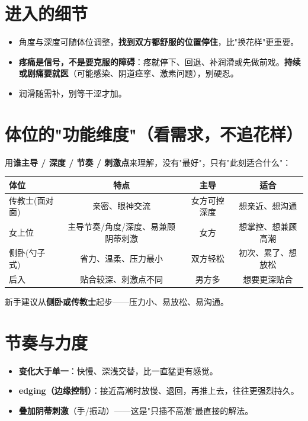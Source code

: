 \section{进入的细节}

\begin{itemize}[leftmargin=2em,itemsep=0.3em]
  \item 角度与深度可随体位调整，\textbf{找到双方都舒服的位置停住}，比"换花样"更重要。
  \item \textbf{疼痛是信号，不是要克服的障碍}：疼就停下、回退、补润滑或先做前戏。\textbf{持续或剧痛要就医}（可能感染、阴道痉挛、激素问题），别硬忍。
  \item 润滑随需补，别等干涩才加。
\end{itemize}

\section{体位的"功能维度"（看需求，不追花样）}

用\textbf{谁主导 / 深度 / 节奏 / 刺激点}来理解，没有"最好"，只有"此刻适合什么"：

\begin{tabularx}{\textwidth}{lCCC}
\toprule
体位 & 特点 & 主导 & 适合 \\
\midrule
传教士(面对面) & 亲密、眼神交流 & 女方可控深度 & 想亲近、想沟通 \\
女上位 & 主导节奏/角度/深度、易兼顾阴蒂刺激 & 女方 & 想掌控、想兼顾高潮 \\
侧卧(勺子式) & 省力、温柔、压力最小 & 双方轻松 & 初次、累了、想放松 \\
后入 & 贴合较深、刺激点不同 & 男方多 & 想要更深贴合 \\
\bottomrule
\end{tabularx}

\vspace{0.5em}
\noindent 新手建议从\textbf{侧卧或传教士}起步——压力小、易放松、易沟通。

\section{节奏与力度}

\begin{itemize}[leftmargin=2em,itemsep=0.3em]
  \item \textbf{变化大于单一}：快慢、深浅交替，比一直猛更有感觉。
  \item \textbf{edging（边缘控制）}：接近高潮时放慢、退回，再推上去，往往更强烈持久。
  \item \textbf{叠加阴蒂刺激}（手/振动）——这是"只插不高潮"最直接的解法。
\end{itemize}

